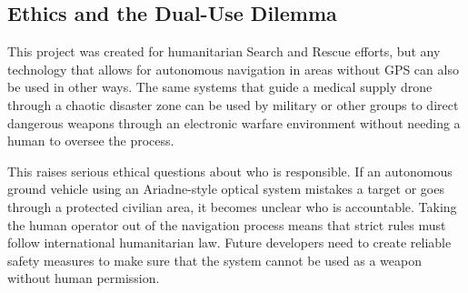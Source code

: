 \documentclass[12pt, a4paper]{article}
\begin{document}
\vspace{0.5cm}

\subsection{Ethics and the Dual-Use Dilemma}

\quad This project was created for humanitarian Search and Rescue efforts, but any technology that allows for autonomous navigation in areas without GPS can also be used in other ways. The same systems that guide a medical supply drone through a chaotic disaster zone can be used by military or other groups to direct dangerous weapons through an electronic warfare environment without needing a human to oversee the process.

\vspace{0.5cm}

This raises serious ethical questions about who is responsible. If an autonomous ground vehicle using an Ariadne-style optical system mistakes a target or goes through a protected civilian area, it becomes unclear who is accountable. Taking the human operator out of the navigation process means that strict rules must follow international humanitarian law. Future developers need to create reliable safety measures to make sure that the system cannot be used as a weapon without human permission.

\newpage


    
\end{document}
